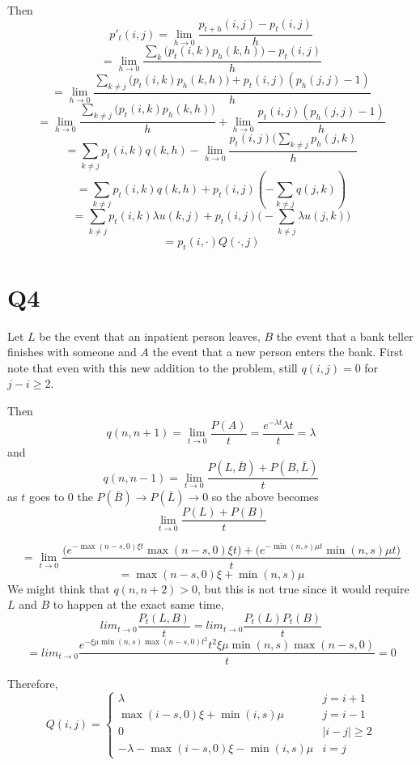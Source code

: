 \documentclass{article}
\begin{document}
Then 
$$
p'_t(i,j) =  \lim_{h \to 0} \frac{p_{t+h}(i,j) - p_t(i,j)}{h}
$$
$$
= \lim_{h \to 0} \frac{\sum_{k} \big(p_t(i,k) p_h(k,h)\big) - p_t(i,j)}{h}
$$
$$
= \lim_{h \to 0} \frac{\sum_{k\neq j} \big(p_t(i,k) p_h(k,h)\big) + p_t(i,j)(p_h(j,j)-1)}{h}
$$
$$
= \lim_{h \to 0} \frac{\sum_{k\neq j} \big(p_t(i,k) p_h(k,h)\big)}{h} + \lim_{h \to 0} \frac{p_t(i,j)(p_h(j,j)-1)}{h}
$$
$$
= \sum_{k\neq j} p_t(i,k) q(k,h) - \lim_{h \to 0} \frac{p_t(i,j)(\sum_{k\neq j} p_h(j,k)}{h}
$$
$$
= \sum_{k\neq j} p_t(i,k) q(k,h)  + p_t(i,j)(-\sum_{k\neq j} q(j,k))
$$
$$
= \sum_{k\neq j} p_t(i,k) \lambda u(k,j)  + p_t(i,j)\big(-\sum_{k\neq j} \lambda u(j,k)\big)
$$
$$
= p_t(i,\cdot) Q(\cdot,j)
$$

\section*{Q4}
Let $L$ be the event that an inpatient person leaves, $B$ the event that a bank teller finishes with someone and $A$ the event that a new person enters the bank. 
First note that even with this new addition to the problem, still $q(i,j) = 0$ for $j - i \geq 2$. 

Then 
$$
q(n, n+1) = \lim_{t \to 0} \frac{P(A)}{t} = \frac{e^{-\lambda t}\lambda t}{t}  =\lambda
$$
and
$$
q(n, n-1) = \lim_{t \to 0} \frac{P(L, \bar{B}) + P(B, \bar{L})}{t} 
$$
as $t$ goes to 0 the $P(\bar{B}) \to P(\bar{L}) \to 0$ so the above becomes 
$$
\lim_{t \to 0} \frac{P(L) + P(B)}{t} 
$$

$$
= \lim_{t \to 0} \frac{ \bigg( e^{-\max(n-s,0)\xi t} \max(n-s,0)\xi t \bigg ) + 
\bigg( e^{-\min(n,s)\mu t} \min(n,s)\mu t \bigg)}{t}
$$
$$
= \max(n-s,0)\xi + \min(n,s)\mu
$$
We might think that $q(n, n+2) > 0$, but this is not true
since it would require $L$ and $B$ to happen at the exact same time,
$$
lim_{t \to 0} \frac{P_t(L, B)}{t} = lim_{t \to 0} \frac{P_t(L)P_t(B)}{t} 
$$
$$
= lim_{t \to 0}\frac{e^{-\xi\mu \min(n,s) \max(n-s,0) t^2}t^2 \xi \mu \min(n,s) \max(n-s,0)}{t} = 0
$$

Therefore,
$$
Q(i,j) = \begin{cases}
\lambda & j = i +1 \\
\max(i-s,0)\xi + \min(i,s)\mu & j = i -1\\
0 & |i-j| \geq 2 \\
-\lambda - \max(i-s,0)\xi - \min(i,s)\mu & i = j
\end{cases}
$$
\end{document}
